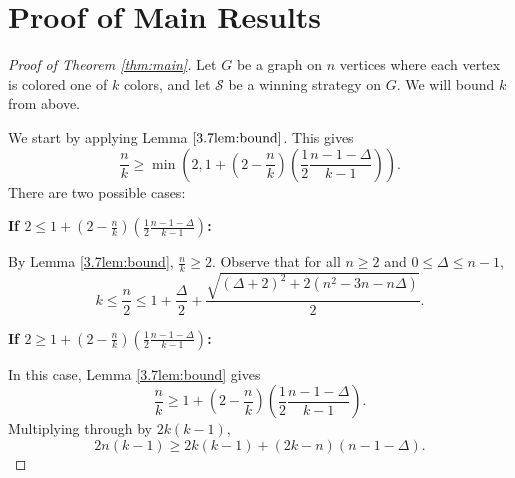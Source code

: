 \documentclass{amsart}
\newcommand{\1}{\mathds{1}}
\numberwithin{theorem}{section}
\def\cS{\ensuremath{\mathcal{S}}}
\begin{document}
\section{Proof of Main Results}
\begin{proof}[Proof of Theorem \ref{thm:main}]
    Let $G$ be a graph on $n$ vertices where each vertex is colored one of $k$ colors, and let $\cS$ be a winning strategy on $G$. %
    We will bound $k$ from above.
    
   We start by applying Lemma $\ref{3.7lem:bound}$. This gives $$\frac{n}{k}\geq \min \left(2, 1+\left(2-\frac{n}{k}\right)\left(\frac{1}{2}\frac{n-1-\Delta}{k-1}\right)\right).$$
   There are two possible cases:

   \medskip

   
   \noindent\textbf{If $2 \leq 1+\left(2-\frac{n}{k}\right)\left(\frac{1}{2}\frac{n-1-\Delta}{k-1}\right)$: } 

   
    By Lemma \ref{3.7lem:bound}, $\frac n k \geq 2$. Observe that for all $n \geq 2$ and $0 \leq \Delta \leq n-1$, 
$$ k \leq \frac{n}{2} \leq  1+\frac{\Delta}{2}+ \frac{\sqrt{(\Delta +2)^2 + 2(n^2-3n-n\Delta)}}{2}.$$ %
    
   
   
    \noindent\textbf{If $ 2 \geq 1+\left(2-\frac{n}{k}\right)\left(\frac{1}{2}\frac{n-1-\Delta}{k-1}\right) $:} 
    
    In this case, Lemma \ref{3.7lem:bound} gives
    $$\frac{n}{k}\geq  1+\left(2-\frac{n}{k}\right)\left(\frac{1}{2}\frac{n-1-\Delta}{k-1}\right).$$
    Multiplying through by $2k(k-1)$, $$2n(k-1)\geq 2k(k-1)+(2k-n)\left(n-1-\Delta\right).$$ 


\end{proof}
\end{document}
